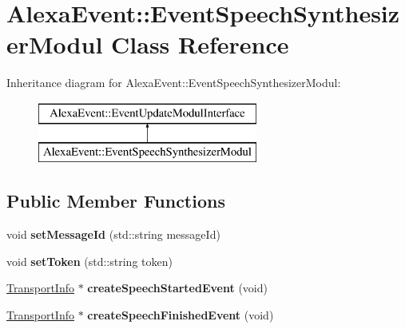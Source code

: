 \hypertarget{classAlexaEvent_1_1EventSpeechSynthesizerModul}{}\section{Alexa\+Event\+:\+:Event\+Speech\+Synthesizer\+Modul Class Reference}
\label{classAlexaEvent_1_1EventSpeechSynthesizerModul}
Inheritance diagram for Alexa\+Event\+:\+:Event\+Speech\+Synthesizer\+Modul\+:\begin{figure}[H]
\begin{center}
\leavevmode
\includegraphics[height=2.000000cm]{db/d40/classAlexaEvent_1_1EventSpeechSynthesizerModul}
\end{center}
\end{figure}
\subsection*{Public Member Functions}
\begin{DoxyCompactItemize}
\item 
\mbox{\label{classAlexaEvent_1_1EventSpeechSynthesizerModul_ad6ec827c64a3978e55cb5d4a12e63f56}} 
void {\bfseries set\+Message\+Id} (std\+::string message\+Id)
\item 
\mbox{\label{classAlexaEvent_1_1EventSpeechSynthesizerModul_a8a8414aa1afc51f2a7d480594de4aae4}} 
void {\bfseries set\+Token} (std\+::string token)
\item 
\mbox{\label{classAlexaEvent_1_1EventSpeechSynthesizerModul_a0ae4770b712ef0f1877396ba52f9b3f7}} 
\hyperlink{classAlexaEvent_1_1TransportInfo}{Transport\+Info} $\ast$ {\bfseries create\+Speech\+Started\+Event} (void)
\item 
\mbox{\label{classAlexaEvent_1_1EventSpeechSynthesizerModul_aa7d727708a4191ad7a6965f3deef71fe}} 
\hyperlink{classAlexaEvent_1_1TransportInfo}{Transport\+Info} $\ast$ {\bfseries create\+Speech\+Finished\+Event} (void)
\end{DoxyCompactItemize}
